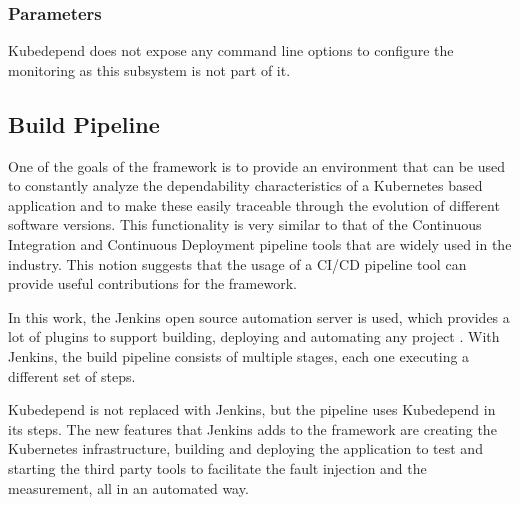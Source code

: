 \subsubsection{Parameters}

Kubedepend does not expose any command line options to configure the monitoring as this subsystem is not part of it.

\subsection{Build Pipeline} \label{cicd}


One of the goals of the framework is to provide an environment that can be used to constantly analyze the dependability characteristics of a Kubernetes based application and to make these easily traceable through the evolution of different software versions. This functionality is very similar to that of the Continuous Integration and Continuous Deployment pipeline tools that are widely used in the industry. This notion suggests that the usage of a CI/CD pipeline tool can provide useful contributions for the framework.

In this work, the Jenkins open source automation server is used, which provides a lot of plugins to support building, deploying and automating any project \cite{Jenkins}. With Jenkins, the build pipeline consists of multiple stages, each one executing a different set of steps.
 
Kubedepend is not replaced with Jenkins, but the pipeline uses Kubedepend in its steps. The new features that Jenkins adds to the framework are creating the Kubernetes infrastructure, building and deploying the application to test and starting the third party tools to facilitate the fault injection and the measurement, all in an automated way.

